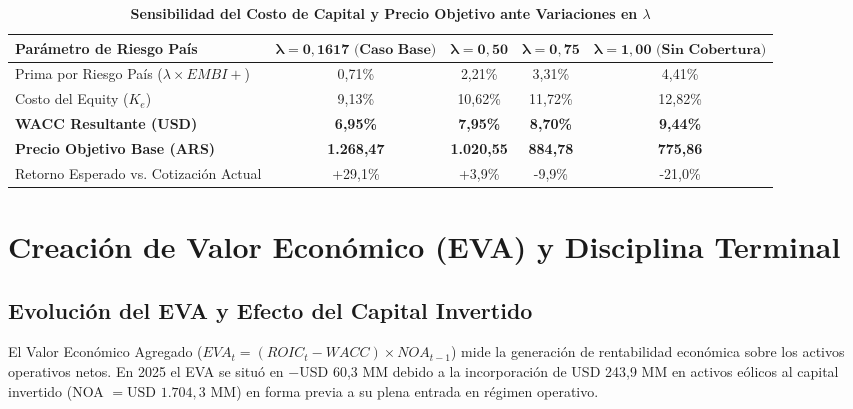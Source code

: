 \documentclass[11pt,a4paper]{article}
\begin{document}
\begin{table}[H]
\centering
\caption{\textbf{Sensibilidad del Costo de Capital y Precio Objetivo ante Variaciones en $\lambda$}}
\small
\begin{tabularx}{\textwidth}{Xcccc}
\toprule
\textbf{Parámetro de Riesgo País} & $\mathbf{\lambda = 0,1617\text{ (Caso Base)}}$ & $\mathbf{\lambda = 0,50}$ & $\mathbf{\lambda = 0,75}$ & $\mathbf{\lambda = 1,00\text{ (Sin Cobertura)}}$ \\
\midrule
Prima por Riesgo País ($\lambda \times EMBI+$) & 0,71\% & 2,21\% & 3,31\% & 4,41\% \\
Costo del Equity ($K_e$) & 9,13\% & 10,62\% & 11,72\% & 12,82\% \\
\textbf{WACC Resultante (USD)} & \textbf{6,95\%} & \textbf{7,95\%} & \textbf{8,70\%} & \textbf{9,44\%} \\
\textbf{Precio Objetivo Base (ARS)} & \textbf{1.268,47} & \textbf{1.020,55} & \textbf{884,78} & \textbf{775,86} \\
Retorno Esperado vs. Cotización Actual & +29,1\% & +3,9\% & -9,9\% & -21,0\% \\
\bottomrule
\end{tabularx}
\end{table}

\section{Creación de Valor Económico (EVA) y Disciplina Terminal}

\subsection{Evolución del EVA y Efecto del Capital Invertido}
El Valor Económico Agregado ($EVA_t = (ROIC_t - WACC) \times NOA_{t-1}$) mide la generación de rentabilidad económica sobre los activos operativos netos. En 2025 el EVA se situó en $-$USD 60,3 MM debido a la incorporación de USD 243,9 MM en activos eólicos al capital invertido (NOA $= \text{USD } 1.704,3\text{ MM}$) en forma previa a su plena entrada en régimen operativo.
\end{document}
